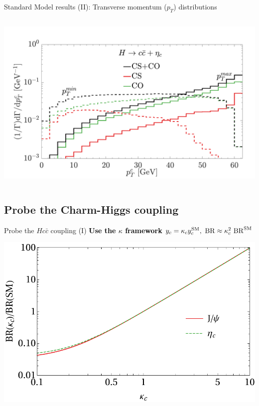 \documentclass[aspectratio=169]{beamer}
\begin{document}
\begin{frame}{Standard Model results (II): Transverse momentum ($p_T$) distributions}
\begin{columns}
\begin{column}{0.5\textwidth}
\begin{center}
		\includegraphics[width=.75\textwidth]{figs/dGmdcptetaSM_Norm.pdf}
		\end{center}
	\end{column}
\end{columns}
\end{frame}

\subsection{Probe the Charm-Higgs coupling}
\begin{frame}{Probe the $Hc{\bar c}$ coupling (I)}
	\vspace{3mm}\hspace{3mm}\textcolor{black}{\bf Use the $\kappa$ framework $y_c=\kappa_c y_c^{\rm SM},~{\rm BR} \approx \kappa_c^2\ {\rm BR}^{\rm SM}$}
	\begin{center}
		\includegraphics[width=.68\textwidth]{figs/BR_ratio.pdf}
	\end{center}
\end{frame}
\end{document}
